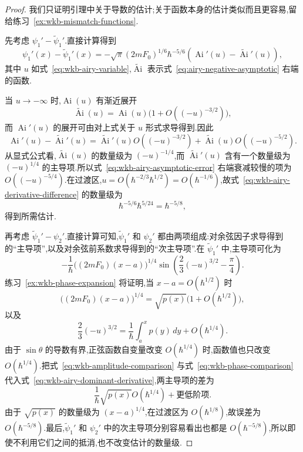 \begin{proof}
我们只证明引理中关于导数的估计;关于函数本身的估计类似而且更容易,留给练习~\ref{ex:wkb-mismatch-functions}.

先考虑 $\psi_1'-\widetilde\psi_1'$.直接计算得到
\[
\psi_1'(x)-\widetilde\psi_1'(x)
=-\sqrt\pi(2mF_0)^{1/6}\hbar^{-5/6}
\left(\operatorname{Ai}'(u)-\widetilde{\operatorname{Ai}}'(u)\right),
\label{eq:wkb-airy-derivative-difference}
\]
其中 $u$ 如式~\eqref{eq:wkb-airy-variable},$\widetilde{\operatorname{Ai}}$ 表示式~\eqref{eq:airy-negative-asymptotic} 右端的函数.

当 $u\to-\infty$ 时,$\operatorname{Ai}(u)$ 有渐近展开
\[
\widetilde{\operatorname{Ai}}(u)=\operatorname{Ai}(u)\bigl(1+O((-u)^{-3/2})\bigr),
\]
而 $\operatorname{Ai}'(u)$ 的展开可由对上式关于 $u$ 形式求导得到.因此
\[
\operatorname{Ai}'(u)-\widetilde{\operatorname{Ai}}'(u)
=\widetilde{\operatorname{Ai}}'(u)O((-u)^{-3/2})
+\widetilde{\operatorname{Ai}}(u)O((-u)^{-5/2}).
\label{eq:wkb-airy-asymptotic-error}
\]
从显式公式看,$\widetilde{\operatorname{Ai}}(u)$ 的数量级为 $(-u)^{-1/4}$,而 $\widetilde{\operatorname{Ai}}'(u)$ 含有一个数量级为 $(-u)^{1/4}$ 的主导项.所以式~\eqref{eq:wkb-airy-asymptotic-error} 右端衰减较慢的项为 $O((-u)^{-5/4})$.在过渡区,$u=O(\hbar^{-2/3}\hbar^{1/2})=O(\hbar^{-1/6})$,故式~\eqref{eq:wkb-airy-derivative-difference} 的数量级为
\[
\hbar^{-5/6}\hbar^{5/24}=\hbar^{-5/8},
\]
得到所需估计.

再考虑 $\widetilde\psi_1'-\psi_2'$.直接计算可知,$\widetilde\psi_1'$ 和 $\psi_2'$ 都由两项组成:对余弦因子求导得到的“主导项”,以及对余弦前系数求导得到的“次主导项”.在 $\widetilde\psi_1'$ 中,主导项可化为
\[
-\frac1\hbar\bigl((2mF_0)(x-a)\bigr)^{1/4}
\sin\left(\frac23(-u)^{3/2}-\frac\pi4\right).
\label{eq:wkb-airy-dominant-derivative}
\]
练习~\ref{ex:wkb-phase-expansion} 将证明,当 $x-a=O(\hbar^{1/2})$ 时
\[
\bigl((2mF_0)(x-a)\bigr)^{1/4}=\sqrt{p(x)}\bigl(1+O(\hbar^{1/2})\bigr),
\label{eq:wkb-amplitude-comparison}
\]
以及
\[
\frac23(-u)^{3/2}=\frac1\hbar\int_a^xp(y)\,dy+O(\hbar^{1/4}).
\label{eq:wkb-phase-comparison}
\]
由于 $\sin\theta$ 的导数有界,正弦函数自变量改变 $O(\hbar^{1/4})$ 时,函数值也只改变 $O(\hbar^{1/4})$.把式~\eqref{eq:wkb-amplitude-comparison} 与式~\eqref{eq:wkb-phase-comparison} 代入式~\eqref{eq:wkb-airy-dominant-derivative},两主导项的差为
\[
\frac1\hbar\sqrt{p(x)}O(\hbar^{1/4})+\text{更低阶项}.
\]
由于 $\sqrt{p(x)}$ 的数量级为 $(x-a)^{1/4}$,在过渡区为 $O(\hbar^{1/8})$,故误差为 $O(\hbar^{-5/8})$.最后,$\widetilde\psi_1'$ 和 $\psi_2'$ 中的次主导项分别容易看出也都是 $O(\hbar^{-5/8})$,所以即使不利用它们之间的抵消,也不改变估计的数量级.
\end{proof}

